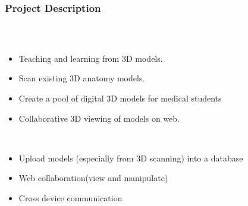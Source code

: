 \begin{frame}
  \frametitle{Project Description}
  \begin{columns}
    \begin{column}{0.8\textwidth}
      \begin{description}[]
        \item[Collaborative 3D Model Viewing] \hfill \\
        \begin{itemize}
          \item Teaching and learning from 3D models.
          \item Scan existing 3D anatomy models.
	\item Create a pool of digital 3D models for medical students
          \item Collaborative  3D viewing of models on web.
        \end{itemize}

        \bigskip
        \item[Our Approach] \hfill \\
          \begin{itemize}
            \item Upload models (especially from 3D scanning) into a database
            \item Web collaboration(view and manipulate)
            \item Cross device communication
        \end{itemize}
      \end{description}
    \end{column}


\end{columns}
\end{frame}

